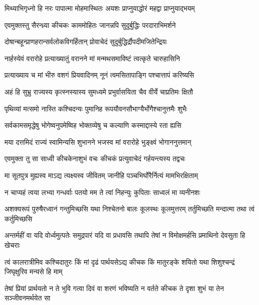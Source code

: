 \twolineshloka
{मिथ्याभिगृध्नो हि नरः पापात्मा मोहमास्थितः}
{अयशः प्राप्नुयाद्धोरं महद्वा प्राप्नुयाद्भयम्}



\twolineshloka
{एवमुक्तस्तु सैरन्ध्र्या कीचकः काममोहितः}
{जानन्नपि सुदुर्बुद्धिः परदाराभिमर्शने}


\twolineshloka
{दोषान्बहून्प्राणहरान्सर्वलोकविगर्हितान्}
{प्रोवाचेदं सुदुर्बुद्धिर्द्रौपदीमजितेन्द्रियः}


\twolineshloka
{नार्हस्येवं वरारोहे प्रत्याख्यातुं वरानने}
{मां मन्मथसमाविष्टं त्वत्कृते चारुहासिनि}


\twolineshloka
{प्रत्याख्याय च मां भीरु वशगं प्रियवादिनम्}
{नूनं त्वमसितापाङ्गि पश्चात्तापं करिष्यसि}


\twolineshloka
{अहं हि सुभ्रु राज्यस्य कृत्स्नस्यास्य सुमध्यमे}
{प्रभुर्वासयिता चैव वीर्ये चाप्रतिमः क्षितौ}


\twolineshloka
{पृथिव्यां मत्समो नास्ति कश्चिदन्यः पुमानिह}
{रूपयौवनसौभाग्यैर्भोगैश्चानुत्तमैः शुभैः}


\twolineshloka
{सर्वकामसमृद्धेषु भोगेष्वनुपमेष्विह}
{भोक्तव्येषु च कल्याणि कस्माद्दास्ये रता ह्यसि}


\twolineshloka
{मया दत्तमिदं राज्यं स्वामिन्यसि शुभानने}
{भजस्व मां वरारोहे भुङ्क्ष्वं भोगाननुत्तमान्}


\twolineshloka
{एवमुक्ता तु सा साध्वी कीचकेनाशुभं वचः}
{कीचकं प्रत्युवाचेदं गर्हयन्त्यस्य तद्वचः}




\twolineshloka
{मा सूतपुत्र मुह्यस्व माऽद्य त्यक्ष्यस्व जीवितम्}
{जानीहि पञ्चभिर्घोरैर्नित्यं मामभिरक्षिताम्}


\twolineshloka
{न चाप्यहं त्वया लभ्या गन्धर्वाः पतयो मम}
{ते त्वां निहन्युः कुपिताः साध्वलं मा व्यनीनशः}


\onelineshloka
{अशक्यरूपं पुरुषैरध्वानं गन्तुमिच्छसि}
\twolineshloka
{यथा निश्चेतनो बालः कूलस्थः कूलमुत्तरम्}
{तर्तुमिच्छति मन्दात्मा तथा त्वं कर्तुमिच्छसि}


\twolineshloka
{अन्तर्महीं वा यदि वोर्ध्वमुत्पतेः समुद्रपारं यदि वा प्रधावसि}
{तथापि तेषां न विमोक्षमर्हसि प्रमाथिनो देवसुता हि खेचराः}


\twolineshloka
{त्वं कालरात्रीमिव कश्चिदातुरः किं मां दृढं पार्थयसेऽद्य कीचक}
{किं मातुरङ्के शयितो यथा शिशुश्चन्द्रं जिघृक्षुरिव मन्यसे हि माम्}


\twolineshloka
{तेषां प्रियां प्रार्थयतो न ते भुवि गत्वा दिवं वा शरणं भविष्यति}
{न वर्तते कीचक ते दृशा शुभं या तेन सञ्जीवनमर्थयेत सा}


